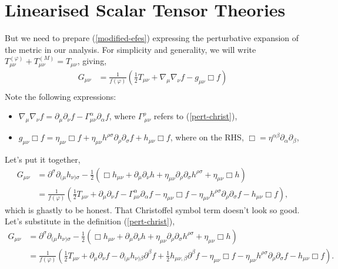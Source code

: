\section{Linearised Scalar Tensor Theories}
 But we need to prepare (\ref{modified-efes}) expressing the perturbative expansion of the metric in our analysis. For simplicity and generality, we will write $T_{\mu\nu}^{(\varphi)} + T_{\mu\nu}^{(M)} = T_{\mu\nu}$, giving, 
\begin{equation}
\begin{split}
    G_{\mu\nu} &= \frac{1}{f(\varphi)}\left(\frac{1}{2}T_{\mu\nu} + \nabla_{\mu}\nabla_{\nu}f - g_{\mu\nu}\Box f\right)\\
\end{split}
\end{equation}
Note the following expressions: 
\begin{itemize}
    \item $\nabla_{\mu}\nabla_{\nu}f = \partial_{\mu}\partial_{\nu}f - \Gamma^{\alpha}_{\mu\nu}\partial_{\alpha}f$, where $\Gamma^{\rho}_{\ \mu\nu}$ refers to (\ref{pert-christ}), 
    \item $g_{\mu\nu}\Box f = \eta_{\mu\nu}\Box f + \eta_{\mu\nu}h^{\rho\sigma}\partial_{\rho}\partial_{\sigma}f + h_{\mu\nu}\Box f$, where on the RHS, $\Box = \eta^{\alpha\beta}\partial_{\alpha}\partial_{\beta}$,
\end{itemize}
Let's put it together, 
\begin{equation}
\begin{split}
    G_{\mu\nu} &= \partial^{\sigma}\partial_{(\mu}h_{\nu)\sigma} - \frac{1}{2}\left(\Box h_{\mu\nu} + \partial_{\mu}\partial_{\nu}h + \eta_{\mu\nu}\partial_{\rho}\partial_{\sigma}h^{\rho\sigma} +\eta_{\mu\nu}\Box h \right)\\ 
    &= \frac{1}{f(\varphi)}\left(\frac{1}{2}T_{\mu\nu} +\partial_{\mu}\partial_{\nu}f - \Gamma^{\alpha}_{\mu\nu}\partial_{\alpha}f - \eta_{\mu\nu}\Box f - \eta_{\mu\nu}h^{\rho\sigma}\partial_{\rho}\partial_{\sigma}f -h_{\mu\nu}\Box f\right),
\end{split}
\end{equation}
which is ghastly to be honest. That Christoffel symbol term doesn't look so good. Let's substitute in the definition (\ref{pert-christ}),
\begin{equation}\label{alt-ein-pert-tensor}
    \begin{split}
    G_{\mu\nu} &= \partial^{\sigma}\partial_{(\mu}h_{\nu)\sigma} - \frac{1}{2}\left(\Box h_{\mu\nu} + \partial_{\mu}\partial_{\nu}h + \eta_{\mu\nu}\partial_{\rho}\partial_{\sigma}h^{\rho\sigma} +\eta_{\mu\nu}\Box h \right)\\ 
    &= \frac{1}{f(\varphi)}\left(\frac{1}{2}T_{\mu\nu} +\partial_{\mu}\partial_{\nu}f -  \partial_{(\mu}h_{\nu)\beta}\partial^{\beta}f + \frac{1}{2}h_{\mu\nu, \beta}\partial^{\beta}f - \eta_{\mu\nu}\Box f - \eta_{\mu\nu}h^{\rho\sigma}\partial_{\rho}\partial_{\sigma}f -h_{\mu\nu}\Box f\right).
    \end{split}
\end{equation}
